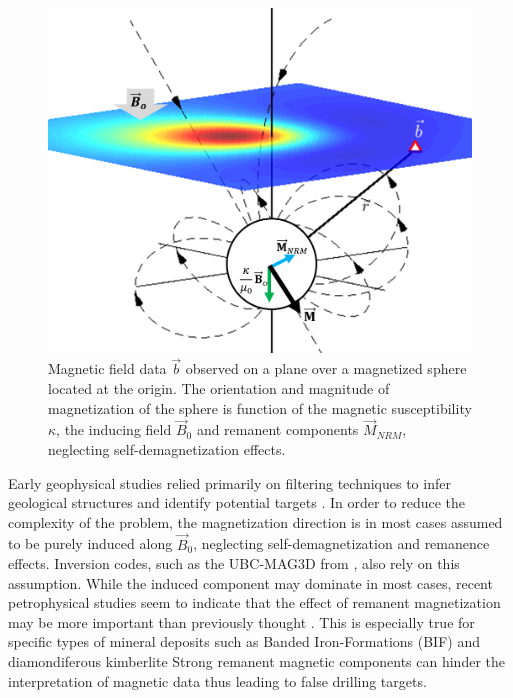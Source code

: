 \begin{figure}[h!]
\centering
\includegraphics[scale=0.55]{Magnetization_EDT.png}
\caption{Magnetic field data $\vec b$ observed on a plane over a magnetized sphere located at the origin. The orientation and magnitude of magnetization of the sphere is function of the magnetic susceptibility $\kappa$, the inducing field $\vec B_0$ and remanent components $\vec M_{NRM}$, neglecting self-demagnetization effects. }
\label{fig:Magnetization}
\end{figure}

Early geophysical studies relied primarily on filtering techniques to infer geological structures and identify potential targets \cite[]{Cowan2000}.
In order to reduce the complexity of the problem, the magnetization direction is in most cases assumed to be purely induced along $\vec B_0$, neglecting self-demagnetization and remanence effects.
Inversion codes, such as the UBC-MAG3D from \cite{LiOldenburg1996}, also rely on this assumption.
While the induced component may dominate in most cases, recent petrophysical studies seem to indicate that the effect of remanent magnetization may be more important than previously thought \cite[]{Enkin2014}.
This is especially true for specific types of mineral deposits such as Banded Iron-Formations (BIF) and diamondiferous kimberlite \cite[]{Dransfield2003, LiShearer10}
Strong remanent magnetic components can hinder the interpretation of magnetic data thus leading to false drilling targets.

